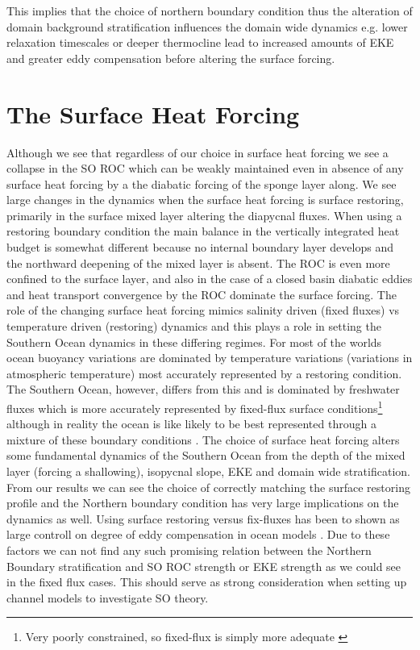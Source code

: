 This implies that the choice of northern boundary condition thus the alteration of domain background stratification influences the domain wide dynamics e.g. lower relaxation timescales or deeper thermocline lead to increased amounts of EKE and greater eddy compensation before altering the surface forcing.  


\section{The Surface Heat Forcing}

Although we see that regardless of our choice in surface heat forcing we see a collapse in the SO ROC which can be weakly maintained even in absence of any surface heat forcing  by a the diabatic forcing of the sponge layer along. We see large changes in the dynamics when the surface heat forcing is surface restoring, primarily in the surface mixed layer altering the diapycnal fluxes. When using a restoring boundary condition the main balance in the vertically integrated heat budget is somewhat different because no internal boundary layer develops and the northward deepening of the mixed layer is absent. The ROC is even more confined to the surface layer, and also in the case of a closed basin diabatic eddies and heat transport convergence by the ROC dominate the surface forcing. The role of the changing surface heat forcing mimics salinity driven (fixed fluxes) vs temperature driven (restoring) dynamics and this plays a role in setting the Southern Ocean dynamics in these differing regimes. For most of the worlds ocean buoyancy variations are dominated by temperature variations (variations in atmospheric temperature) most accurately represented by a restoring condition. The Southern Ocean, however, differs from this and is dominated by freshwater fluxes \citep{Karstensen2011} %
which is more accurately represented by fixed-flux surface conditions\footnote{Very poorly constrained, so fixed-flux is simply more adequate \citep{Jansen2016}} although in reality the ocean is like likely to be best represented through a mixture of these boundary conditions \citep{Stewart2014}.
The choice of surface heat forcing alters some fundamental dynamics of the Southern Ocean from the depth of the mixed layer (forcing a shallowing), isopycnal slope, EKE and domain wide stratification. From our results we can see the choice of correctly matching the surface restoring profile and the Northern boundary condition has very large implications on the dynamics as well. Using surface restoring versus fix-fluxes has been to shown as large controll on degree of eddy compensation in ocean models \citep{Gent2015}. Due to these factors we can not find any such promising relation between the Northern Boundary stratification and SO ROC strength or EKE strength as we could see in the fixed flux cases. This should serve as strong consideration when setting up channel models to investigate SO theory. 


